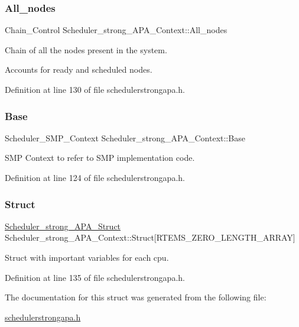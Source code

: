 \subsubsection{\texorpdfstring{All\+\_\+nodes}{All\_nodes}}
{\footnotesize\ttfamily Chain\+\_\+\+Control Scheduler\+\_\+strong\+\_\+\+A\+P\+A\+\_\+\+Context\+::\+All\+\_\+nodes}



Chain of all the nodes present in the system. 

Accounts for ready and scheduled nodes. 

Definition at line 130 of file schedulerstrongapa.\+h.

\mbox{\label{structScheduler__strong__APA__Context_a55755b445b7e7beaf1b87b178521e615}} 
\subsubsection{\texorpdfstring{Base}{Base}}
{\footnotesize\ttfamily Scheduler\+\_\+\+S\+M\+P\+\_\+\+Context Scheduler\+\_\+strong\+\_\+\+A\+P\+A\+\_\+\+Context\+::\+Base}



S\+MP Context to refer to S\+MP implementation code. 



Definition at line 124 of file schedulerstrongapa.\+h.

\mbox{\label{structScheduler__strong__APA__Context_ac25debff84510636df8e42c5750ace15}} 
\subsubsection{\texorpdfstring{Struct}{Struct}}
{\footnotesize\ttfamily \hyperlink{structScheduler__strong__APA__Struct}{Scheduler\+\_\+strong\+\_\+\+A\+P\+A\+\_\+\+Struct} Scheduler\+\_\+strong\+\_\+\+A\+P\+A\+\_\+\+Context\+::\+Struct\mbox{[}R\+T\+E\+M\+S\+\_\+\+Z\+E\+R\+O\+\_\+\+L\+E\+N\+G\+T\+H\+\_\+\+A\+R\+R\+AY\mbox{]}}



Struct with important variables for each cpu. 



Definition at line 135 of file schedulerstrongapa.\+h.



The documentation for this struct was generated from the following file\+:\begin{DoxyCompactItemize}
\item 
\hyperlink{schedulerstrongapa_8h}{schedulerstrongapa.\+h}\end{DoxyCompactItemize}
